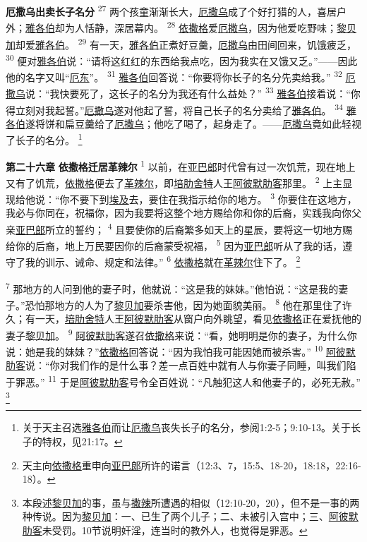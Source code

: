 \textbf{厄撒乌出卖长子名分 }
\textsuperscript{27}
两个孩童渐渐长大，\uline{厄撒乌}成了个好打猎的人，喜居户外；\uline{雅各伯}却为人恬静，深居幕内。
\textsuperscript{28}
\uline{依撒格}爱\uline{厄撒乌}，因为他爱吃野味；\uline{黎贝加}却爱\uline{雅各伯}。
\textsuperscript{29}
有一天，\uline{雅各伯}正煮好豆羹，\uline{厄撒乌}由田间回来，饥饿疲乏，
\textsuperscript{30}
便对\uline{雅各伯}说：“请将这红红的东西给我点吃，因为我实在又饿又乏。”——因此他的名字又叫“\uline{厄东}”。
\textsuperscript{31}
\uline{雅各伯}回答说：“你要将你长子的名分先卖给我。”
\textsuperscript{32}
\uline{厄撒乌}说：“我快要死了，这长子的名分为我还有什么益处？”
\textsuperscript{33}
\uline{雅各伯}接着说：“你得立刻对我起誓。”\uline{厄撒乌}遂对他起了誓，将自己长子的名分卖给了\uline{雅各伯}。
\textsuperscript{34}
\uline{雅各伯}遂将饼和扁豆羹给了\uline{厄撒乌}；他吃了喝了，起身走了。——\uline{厄撒乌}竟如此轻视了长子的名分。
\footnote{关于天主召选\uline{雅各伯}而让\uline{厄撒乌}丧失长子的名分，参阅1:2-5；9:10-13。关于长子的特权，见21:17。}

\textbf{第二十六章 }
\textbf{依撒格迁居革辣尔 }
\textsuperscript{1}
以前，在\uline{亚巴郎}时代曾有过一次饥荒，现在地上又有了饥荒，\uline{依撒格}便去了\uline{革辣尔}，即\uline{培肋}\uline{舍特}人王\uline{阿彼默}\uline{肋客}那里。
\textsuperscript{2}
上主显现给他说：“你不要下到\uline{埃及}去，要住在我指示给你的地方。
\textsuperscript{3}
你要住在这地方，我必与你同在，祝福你，因为我要将这整个地方赐给你和你的后裔，实践我向你父亲\uline{亚巴郎}所立的誓约；
\textsuperscript{4}
且要使你的后裔繁多如天上的星辰，要将这一切地方赐给你的后裔，地上万民要因你的后裔蒙受祝福，
\textsuperscript{5}
因为\uline{亚巴郎}听从了我的话，遵守了我的训示、诫命、规定和法律。”
\textsuperscript{6}
\uline{依撒格}就在\uline{革辣尔}住下了。
\footnote{天主向\uline{依撒格}重申向\uline{亚巴郎}所许的诺言（12:3、7，15:5、18-20，18:18，22:16-18）。}

\textsuperscript{7}
那地方的人问到他的妻子时，他就说：“这是我的妹妹。”他怕说：“这是我的妻子。”恐怕那地方的人为了\uline{黎贝加}要杀害他，因为她面貌美丽。
\textsuperscript{8}
他在那里住了许久；有一天，\uline{培肋}\uline{舍特}人王\uline{阿彼默}\uline{肋客}从窗户向外眺望，看见\uline{依撒格}正在爱抚他的妻子\uline{黎贝加}。
\textsuperscript{9}
\uline{阿彼默}\uline{肋客}遂召\uline{依撒格}来说：“看，她明明是你的妻子，为什么你说：她是我的妹妹？”\uline{依撒格}回答说：“因为我怕我可能因她而被杀害。”
\textsuperscript{10}
\uline{阿彼默}\uline{肋客}说：“你对我们作的是什么事？差一点百姓中就有人与你妻子同睡，叫我们陷于罪恶。”
\textsuperscript{11}
于是\uline{阿彼默}\uline{肋客}号令全百姓说：“凡触犯这人和他妻子的，必死无赦。”
\footnote{本段述\uline{黎贝加}的事，虽与\uline{撒辣}所遭遇的相似（12:10-20，20），但不是一事的两种传说。因为\uline{黎贝加}：一、已生了两个儿子；二、未被引入宫中；三、\uline{阿彼默}\uline{肋客}未受罚。10节说明奸淫，连当时的教外人，也觉得是罪恶。}

